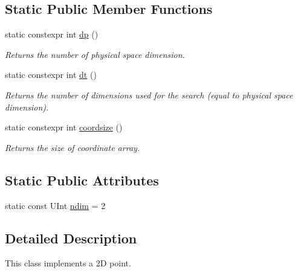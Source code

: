 \subsection*{Static Public Member Functions}
\begin{DoxyCompactItemize}
\item 
\hypertarget{classPoint_aff2972e71baa58292b080fb164de8ca6}{
static constexpr int \hyperlink{classPoint_aff2972e71baa58292b080fb164de8ca6}{dp} ()}
\label{classPoint_aff2972e71baa58292b080fb164de8ca6}

\begin{DoxyCompactList}\small\item\em Returns the number of physical space dimension. \item\end{DoxyCompactList}\item 
\hypertarget{classPoint_a3e43ae96cdd00fe2e6ba73e42031ad55}{
static constexpr int \hyperlink{classPoint_a3e43ae96cdd00fe2e6ba73e42031ad55}{dt} ()}
\label{classPoint_a3e43ae96cdd00fe2e6ba73e42031ad55}

\begin{DoxyCompactList}\small\item\em Returns the number of dimensions used for the search (equal to physical space dimension). \item\end{DoxyCompactList}\item 
\hypertarget{classPoint_a2798999b4a017d89616eb4f5a95ac12b}{
static constexpr int \hyperlink{classPoint_a2798999b4a017d89616eb4f5a95ac12b}{coordsize} ()}
\label{classPoint_a2798999b4a017d89616eb4f5a95ac12b}

\begin{DoxyCompactList}\small\item\em Returns the size of coordinate array. \item\end{DoxyCompactList}\end{DoxyCompactItemize}
\subsection*{Static Public Attributes}
\begin{DoxyCompactItemize}
\item 
static const UInt \hyperlink{classPoint_ac784604377be8075032dcc79d14d7e8b}{ndim} = 2
\end{DoxyCompactItemize}


\subsection{Detailed Description}
This class implements a 2D point. 

